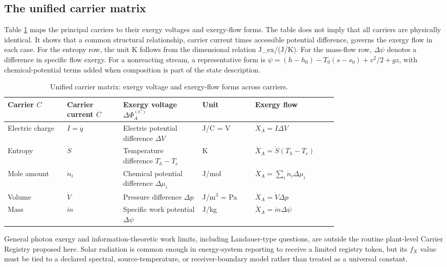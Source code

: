 \documentclass[11pt]{article}
\newcommand{\fx}{f_X}
\newcommand{\XdotA}{\dot{X}_A}
\begin{document}
\subsection{The unified carrier matrix}

Table \ref{tab:carrier_matrix} maps the principal carriers to their exergy voltages and exergy-flow forms. The table does not imply that all carriers are physically identical. It shows that a common structural relationship, carrier current times accessible potential difference, governs the exergy flow in each case. For the entropy row, the unit K follows from the dimensional relation J\_ex/(J/K). For the mass-flow row, $\Delta\psi$ denotes a difference in specific flow exergy. For a nonreacting stream, a representative form is $\psi=(h-h_0)-T_0(s-s_0)+v^2/2+gz$, with chemical-potential terms added when composition is part of the state description.

\begin{table}[H]
\centering
\small
\caption{Unified carrier matrix: exergy voltage and exergy-flow forms across carriers.}
\label{tab:carrier_matrix}
\begin{tabularx}{\linewidth}{@{}p{0.18\linewidth}p{0.17\linewidth}p{0.24\linewidth}p{0.16\linewidth}X@{}}
\toprule
Carrier $C$ & Carrier current $\dot{C}$ & Exergy voltage $\Delta\Phi_A^{(C)}$ & Unit & Exergy flow \\
\midrule
Electric charge & $I=\dot{q}$ & Electric potential difference $\Delta V$ & J/C = V & $\XdotA=I\Delta V$ \\
Entropy & $\dot{S}$ & Temperature difference $T_h-T_c$ & K & $\XdotA=\dot{S}(T_h-T_c)$ \\
Mole amount & $\dot{n}_i$ & Chemical potential difference $\Delta\mu_i$ & J/mol & $\XdotA=\sum_i \dot{n}_i\Delta\mu_i$ \\
Volume & $\dot{V}$ & Pressure difference $\Delta p$ & J/m$^3$ = Pa & $\XdotA=\dot{V}\Delta p$ \\
Mass & $\dot{m}$ & Specific work potential $\Delta\psi$ & J/kg & $\XdotA=\dot{m}\Delta\psi$ \\
\bottomrule
\end{tabularx}
\end{table}

General photon exergy and information-theoretic work limits, including Landauer-type questions, are outside the routine plant-level Carrier Registry proposed here. Solar radiation is common enough in energy-system reporting to receive a limited registry token, but its $\fx$ value must be tied to a declared spectral, source-temperature, or receiver-boundary model rather than treated as a universal constant.
\end{document}
